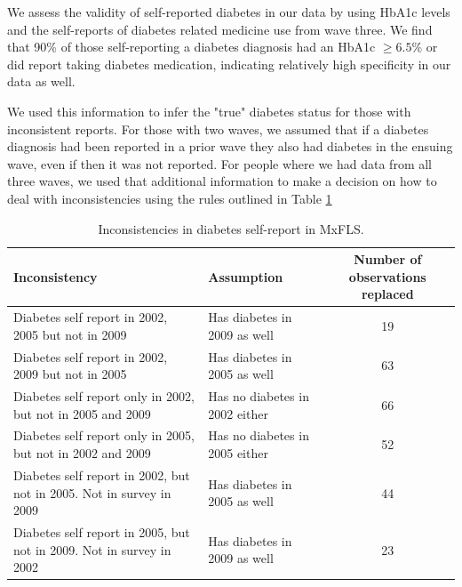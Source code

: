 We assess the validity of self-reported diabetes in our data by using \ac{HbA1c} levels and the self-reports of diabetes related medicine use from wave three. We find that 90\% of those self-reporting a diabetes diagnosis had an \ac{HbA1c} $\geq6.5$\% or did report taking diabetes medication, indicating relatively high specificity in our data as well.

We used this information to infer the "true" diabetes status for those with inconsistent reports. For those with two waves, we assumed that if a diabetes diagnosis had been reported in a prior wave they also had diabetes in the ensuing wave, even if then it was not reported.
For people where we had data from all three waves, we used that additional information to make a decision on how to deal with inconsistencies using the rules outlined in Table \ref{tab:Inconsistencies}

\begin{table}[h!]
\caption{\label{tab:Inconsistencies}Inconsistencies in diabetes self-report in MxFLS.}
\begin{center}
\begin{adjustbox}{max width=\linewidth} 
\begin{tabular}{llc}
\hline 
Inconsistency  & Assumption  & Number of observations replaced\tabularnewline
\hline 
Diabetes self report in 2002, 2005 but not in 2009  & Has diabetes in 2009 as well  & 19\tabularnewline
Diabetes self report in 2002, 2009 but not in 2005  & Has diabetes in 2005 as well  & 63\tabularnewline
Diabetes self report only in 2002, but not in 2005 and 2009  & Has no diabetes in 2002 either  & 66\tabularnewline
Diabetes self report only in 2005, but not in 2002 and 2009  & Has no diabetes in 2005 either  & 52\tabularnewline
Diabetes self report in 2002, but not in 2005. Not in survey in 2009  & Has diabetes in 2005 as well  & 44\tabularnewline
Diabetes self report in 2005, but not in 2009. Not in survey in 2002  & Has diabetes in 2009 as well  & 23\tabularnewline
\end{tabular}
\end{adjustbox}
\end{center}
\end{table}


